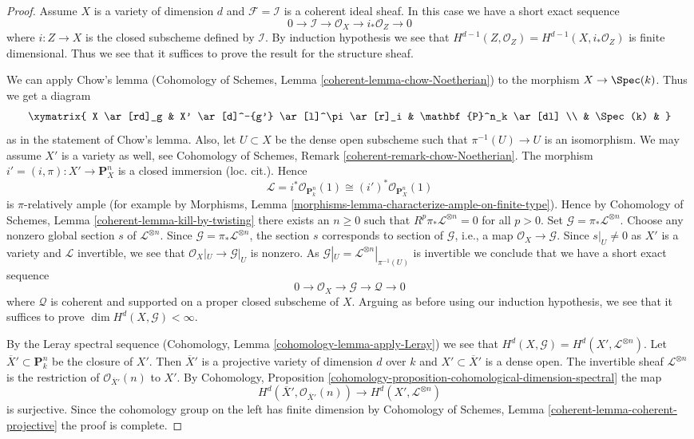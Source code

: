 \begin{proof}
\medskip\noindent
Assume $X$ is a variety of dimension $d$ and 
$\mathcal{F} = \mathcal{I}$ is a coherent ideal sheaf. In this
case we have a short exact sequence
$$
0 \to \mathcal{I} \to \mathcal{O}_X \to i_*\mathcal{O}_Z \to 0
$$
where $i : Z \to X$ is the closed subscheme defined by $\mathcal{I}$.
By induction hypothesis we see that
$H^{d - 1}(Z, \mathcal{O}_Z) = H^{d - 1}(X, i_*\mathcal{O}_Z)$ is
finite dimensional. Thus we see that it suffices to prove the result
for the structure sheaf.

\medskip\noindent
We can apply Chow's lemma
(Cohomology of Schemes, Lemma \ref{coherent-lemma-chow-Noetherian})
to the morphism $X \to \Spec(k)$. Thus we get a diagram
$$
\xymatrix{
X \ar[rd]_g & X' \ar[d]^-{g'} \ar[l]^\pi \ar[r]_i & \mathbf{P}^n_k \ar[dl] \\
& \Spec(k) &
}
$$
as in the statement of Chow's lemma. Also, let $U \subset X$ be
the dense open subscheme such that $\pi^{-1}(U) \to U$ is an isomorphism.
We may assume $X'$ is a variety as well, see
Cohomology of Schemes, Remark \ref{coherent-remark-chow-Noetherian}.
The morphism $i' = (i, \pi) : X' \to \mathbf{P}^n_X$ is
a closed immersion (loc. cit.). Hence
$$
\mathcal{L} = i^*\mathcal{O}_{\mathbf{P}^n_k}(1) \cong
(i')^*\mathcal{O}_{\mathbf{P}^n_X}(1)
$$
is $\pi$-relatively ample (for example by
Morphisms, Lemma \ref{morphisms-lemma-characterize-ample-on-finite-type}).
Hence by Cohomology of Schemes, Lemma \ref{coherent-lemma-kill-by-twisting}
there exists an $n \geq 0$ such that
$R^p\pi_*\mathcal{L}^{\otimes n} = 0$ for all $p > 0$.
Set $\mathcal{G} = \pi_*\mathcal{L}^{\otimes n}$.
Choose any nonzero global section $s$ of $\mathcal{L}^{\otimes n}$.
Since $\mathcal{G} = \pi_*\mathcal{L}^{\otimes n}$, the section $s$
corresponds to section of $\mathcal{G}$, i.e., a map
$\mathcal{O}_X \to \mathcal{G}$.
Since $s|_U \not = 0$ as $X'$ is a variety and $\mathcal{L}$
invertible, we see that $\mathcal{O}_X|_U \to \mathcal{G}|_U$
is nonzero. As $\mathcal{G}|_U = \mathcal{L}^{\otimes n}|_{\pi^{-1}(U)}$
is invertible we conclude that we have a short exact sequence
$$
0 \to \mathcal{O}_X \to \mathcal{G} \to \mathcal{Q} \to 0
$$
where $\mathcal{Q}$ is coherent and supported on a proper
closed subscheme of $X$. Arguing as before using our induction
hypothesis, we see that it
suffices to prove $\dim H^d(X, \mathcal{G}) < \infty$.

\medskip\noindent
By the Leray spectral sequence
(Cohomology, Lemma \ref{cohomology-lemma-apply-Leray})
we see that $H^d(X, \mathcal{G}) = H^d(X', \mathcal{L}^{\otimes n})$.
Let $\overline{X}' \subset \mathbf{P}^n_k$ be the closure
of $X'$. Then $\overline{X}'$ is a projective variety of dimension $d$
over $k$ and $X' \subset \overline{X}'$ is a dense open.
The invertible sheaf $\mathcal{L}^{\otimes n}$ is the restriction of
$\mathcal{O}_{\overline{X}'}(n)$ to $X'$. By
Cohomology, Proposition
\ref{cohomology-proposition-cohomological-dimension-spectral}
the map
$$
H^d(\overline{X}', \mathcal{O}_{\overline{X}'}(n))
\longrightarrow
H^d(X', \mathcal{L}^{\otimes n})
$$
is surjective. Since the cohomology group on the left has
finite dimension by
Cohomology of Schemes, Lemma \ref{coherent-lemma-coherent-projective}
the proof is complete.
\end{proof}
